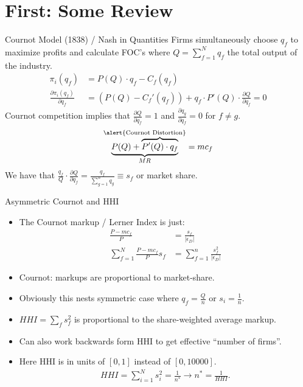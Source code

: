 \section{First: Some Review}


\begin{frame}{Cournot Model (1838) / Nash in Quantities}
Firms simultaneously choose $q_f$ to maximize profits and calculate FOC's where $Q=\sum_{f=1}^N q_f$ the total output of the industry.
\begin{align*}
\pi_i(q_f) &= P(Q)\cdot q_f - C_f(q_f)\\
\frac{\partial \pi_i(q_f)}{\partial q_f} &= (P(Q) - C_f'(q_f))  +  q_f  \cdot P'(Q) \cdot \frac{\partial Q}{\partial q_f}  = 0
\end{align*}
Cournot competition implies that $\frac{\partial Q}{\partial q_f} = 1$ and $\frac{\partial q_g}{\partial q_f} = 0$ for $f \neq g$.
\begin{align*}
\underbrace{P(Q) + \overbrace{P'(Q) \cdot q_f}}^{\text{\alert{Cournot Distortion}}}_{MR} =  mc_f
\end{align*}
We have that $\frac{q_f}{Q} \cdot \frac{\partial Q}{\partial q_f} = \frac{q_f}{\sum_{g=1}^n q_g} \equiv s_f$ or \alert{market share}.
\end{frame}




\begin{frame}{Asymmetric Cournot and HHI}
\begin{itemize}
\item The Cournot markup / Lerner Index is just:
\begin{align*}
\frac{P-mc_f}{P} &= \frac{s_f}{|\epsilon_D|}\\
\sum_{f=1}^N \frac{P - mc_f}{P} s_f &= \sum_{f=1}^n \frac{s_f^2}{|\epsilon_D|}
\end{align*}
\item Cournot: markups are proportional to market-share.
\item Obviously this nests symmetric case where $q_f = \frac{Q}{n}$ or $s_i = \frac{1}{n}$.
\item $HHI = \sum_f s_f^2$ is proportional to the \alert{share-weighted average markup}.
\item Can also work backwards form HHI to get effective ``number of firms''.
\item Here HHI is in units of $[0,1]$ instead of $[0,10000]$.
\begin{align*}
HHI = \sum_{i=1}^N s_i^2 = \frac{1}{n^*} \rightarrow n^{*} = \frac{1}{HHI}.
\end{align*}
\end{itemize}
\end{frame}



